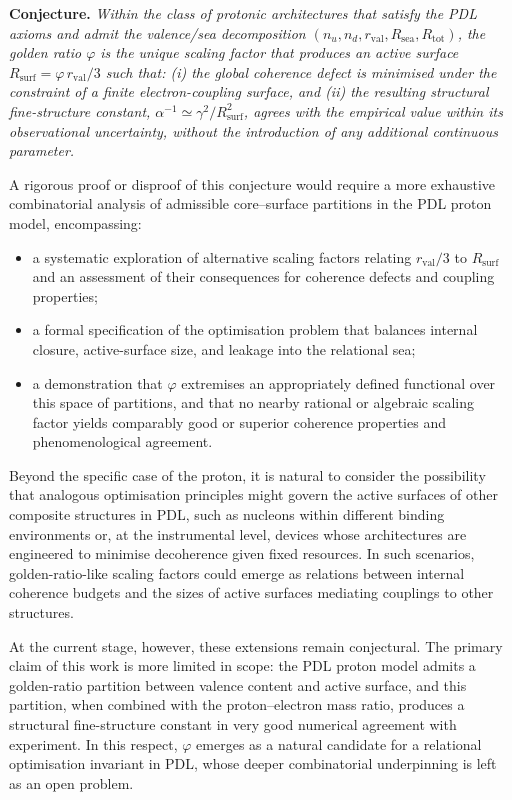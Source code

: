 \documentclass[11pt,a4paper]{article}
\numberwithin{equation}{section}
\begin{document}
\medskip
\noindent\textbf{Conjecture.} \emph{Within the class of protonic architectures that satisfy the PDL axioms and admit the valence/sea decomposition $(n_u,n_d,r_{\mathrm{val}},R_{\mathrm{sea}},R_{\mathrm{tot}})$, the golden ratio $\varphi$ is the unique scaling factor that produces an active surface $R_{\mathrm{surf}}=\varphi\,r_{\mathrm{val}}/3$ such that:
(i) the global coherence defect is minimised under the constraint of a finite electron-coupling surface, and
(ii) the resulting structural fine-structure constant, $\alpha^{-1}\simeq\gamma^2/R_{\mathrm{surf}}^2$, agrees with the empirical value within its observational uncertainty, without the introduction of any additional continuous parameter.}
\medskip

A rigorous proof or disproof of this conjecture would require a more exhaustive combinatorial analysis of admissible core--surface partitions in the PDL proton model, encompassing:
\begin{itemize}
  \item a systematic exploration of alternative scaling factors relating $r_{\mathrm{val}}/3$ to $R_{\mathrm{surf}}$ and an assessment of their consequences for coherence defects and coupling properties;
  \item a formal specification of the optimisation problem that balances internal closure, active-surface size, and leakage into the relational sea;
  \item a demonstration that $\varphi$ extremises an appropriately defined functional over this space of partitions, and that no nearby rational or algebraic scaling factor yields comparably good or superior coherence properties and phenomenological agreement.
\end{itemize}

Beyond the specific case of the proton, it is natural to consider the possibility that analogous optimisation principles might govern the active surfaces of other composite structures in PDL, such as nucleons within different binding environments or, at the instrumental level, devices whose architectures are engineered to minimise decoherence given fixed resources. In such scenarios, golden-ratio-like scaling factors could emerge as relations between internal coherence budgets and the sizes of active surfaces mediating couplings to other structures.

At the current stage, however, these extensions remain conjectural. The primary claim of this work is more limited in scope: the PDL proton model admits a golden-ratio partition between valence content and active surface, and this partition, when combined with the proton–electron mass ratio, produces a structural fine-structure constant in very good numerical agreement with experiment. In this respect, $\varphi$ emerges as a natural candidate for a relational optimisation invariant in PDL, whose deeper combinatorial underpinning is left as an open problem.
\end{document}
